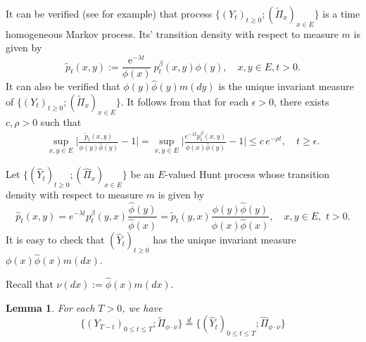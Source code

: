 \documentclass[12pt,a4paper]{amsart}
\numberwithin{equation}{section}
\theoremstyle{plain}
\newtheorem{lem}[thm]{Lemma}
\theoremstyle{definition}
\begin{document}
It can be verified (see \cite{KimSong2008Intrinsic} for example) that process $\{(Y_t)_{t\geq 0}; (\widetilde\Pi_x)_{x\in E}\}$ is a time homogeneous Markov process.
Its' transition density with respect to measure $m$ is given by
\begin{equation}
  \label{eq:tilde_p}
  \widetilde p_t(x, y)
  :=\frac{\mbox{e}^{-\lambda t}}{\phi(x)}\ p^\beta_t(x, y)\phi(y),
  \quad x,y \in E,t>0.
\end{equation}
It can also be verified that $\phi(y)\widehat{\phi}(y)m(dy)$ is the unique invariant measure of $\{(Y_t)_{t\geq 0}; (\widetilde\Pi_x)_{x\in E}\}$.
It follows from \cite[Theorem 2.7]{KimSong2008Intrinsic} that for each $\epsilon > 0$, there exists $c, \rho > 0$ such that 
\begin{align}
\label{eq:IU}
	\sup_{x,y\in E}\Big|\frac{\widetilde p_t(x,y)}{\phi(y) \widehat\phi(y)}- 1\Big|
	=\sup_{x,y\in E}\Big|\frac{e^{-\lambda t}p^\beta_t(x,y)}{\phi(x) \widehat\phi(y)}- 1\Big|
	\leq c\,e^{-\rho t},
	\quad t\geq \epsilon.
\end{align}
\par
Let $\{(\widehat{Y}_t)_{t\geq 0}; (\widehat{\Pi}_x)_{x\in E}\}$ be an $E$-valued Hunt process whose transition density with respect to measure $m$ is given by
\[
  \widehat{p}_t(x,y)
  =e^{-\lambda t}p^\beta_t(y,x)\frac{{\widehat\phi}(y)}{{\widehat\phi}(x)}
  =\widetilde p_t(y,x)\frac{\phi(y){\widehat\phi}(y)}{\phi(x){\widehat\phi}(x)},
  \quad x,y \in E,\,\, t> 0.
\]
It is easy to check that $(\widehat Y_t)_{t\geq 0}$ has the unique invariant measure $\phi(x)\widehat\phi(x)m(dx)$.
\par
Recall that $\nu(dx):=\widehat\phi(x)m(dx)$.
\begin{lem}
  \label{lem:reverse of the spine}
	For each $T > 0$, we have
  \[
    \{(Y_{T-t})_{0\leq t\leq T}; \widetilde \Pi_{\phi \cdot \nu}\}
    \overset{d}{=} \{(\widehat Y_{t})_{0\leq t\leq T}; \widehat \Pi_{\phi \cdot \nu}\}
  \]
\end{lem}
\end{document}
